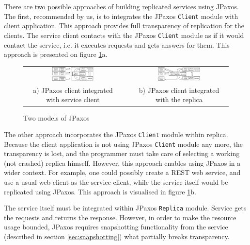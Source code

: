 There are two possible approaches of building replicated services using JPaxos.
The first, recommended by us, is to integrates the JPaxos \texttt{Client}
module with client application.  This approach provides full transparency of
replication for the clients. The service client contacts with the JPaxos
\texttt{Client} module as if it would contact the service, i.e. it executes
requests and gets answers for them. This approach is presented on figure
\ref{fig:jpaxos_processes}a. 

\begin{figure}[h]
 \begin{tabular}{ccc}
  \includegraphics[width=0.45\textwidth]{architecture/userArchitecture1.pdf}
  &
  \hspace{0.01\textwidth}
  &
  \includegraphics[width=0.45\textwidth]{architecture/userArchitecture2.pdf}
  \\ 
  \scriptsize a) JPaxos client integrated with service client
  & & 
  \scriptsize b) JPaxos client integrated with the replica\\
 \end{tabular}
 \caption{Two models of JPaxos}\label{fig:jpaxos_processes}
\end{figure}

The other approach incorporates the JPaxos \texttt{Client} module within
replica. Because the client application is not using JPaxos \texttt{Client}
module any more, the transparency is lost, and the programmer must
take care of selecting a working (not crashed) replica himself. However, this
approach enables using JPaxos in a wider context. For example, one could
possibly create a REST web service, and use a usual web client as the service
client, while the service itself would be replicated using JPaxos.  This
approach is visualised in figure \ref{fig:jpaxos_processes}b.


The service itself must be integrated within JPaxos \texttt{Replica} module. Service gets the requests and returns the response. However, in order to make the resource usage bounded, JPaxos requires snapshotting functionality from the service (described in section \ref{sec:snapshotting})
what partially breaks transparency. 

